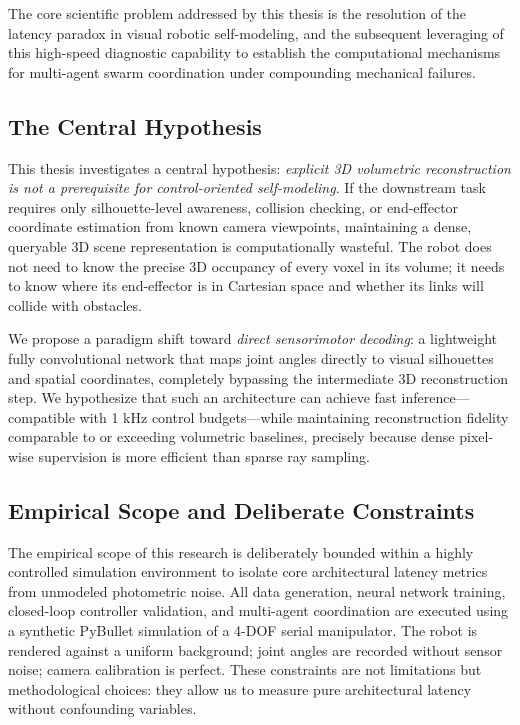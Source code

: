 \documentclass[12pt,a4paper,oneside]{report}
\begin{document}
The core scientific problem addressed by this thesis is the resolution of the latency paradox in visual robotic self-modeling, and the subsequent leveraging of this high-speed diagnostic capability to establish the computational mechanisms for multi-agent swarm coordination under compounding mechanical failures.

\subsection{The Central Hypothesis}

This thesis investigates a central hypothesis: \textit{explicit 3D volumetric reconstruction is not a prerequisite for control-oriented self-modeling}. If the downstream task requires only silhouette-level awareness, collision checking, or end-effector coordinate estimation from known camera viewpoints, maintaining a dense, queryable 3D scene representation is computationally wasteful. The robot does not need to know the precise 3D occupancy of every voxel in its volume; it needs to know where its end-effector is in Cartesian space and whether its links will collide with obstacles.

We propose a paradigm shift toward \textit{direct sensorimotor decoding}: a lightweight fully convolutional network that maps joint angles directly to visual silhouettes and spatial coordinates, completely bypassing the intermediate 3D reconstruction step. We hypothesize that such an architecture can achieve fast inference—compatible with 1 kHz control budgets—while maintaining reconstruction fidelity comparable to or exceeding volumetric baselines, precisely because dense pixel-wise supervision is more efficient than sparse ray sampling.

\subsection{Empirical Scope and Deliberate Constraints}

The empirical scope of this research is deliberately bounded within a highly controlled simulation environment to isolate core architectural latency metrics from unmodeled photometric noise. All data generation, neural network training, closed-loop controller validation, and multi-agent coordination are executed using a synthetic PyBullet simulation of a 4-DOF serial manipulator. The robot is rendered against a uniform background; joint angles are recorded without sensor noise; camera calibration is perfect. These constraints are not limitations but methodological choices: they allow us to measure pure architectural latency without confounding variables.
\end{document}
